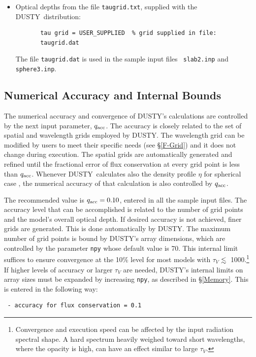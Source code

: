 \documentclass[11pt]{article}
\def\D  {{\sf DUSTY}}
\def\laa    {\mathrel{\hbox{\raise.3ex\hbox{$<$}\llap
                                {\lower.8ex\hbox{$\sim$}}}}}
\def\la     {\hbox{$\laa$}}
\def\tV     {\hbox{$\tau_V$}}
\begin{document}
\begin{enumerate}
\begin{itemize}
\item Optical depths from the file {\tt taugrid.txt}, supplied with the
    \D\ distribution:
\begin{verbatim}
       tau grid = USER_SUPPLIED  % grid supplied in file:
       taugrid.dat
\end{verbatim}
The file {\tt taugrid.dat} is used in the sample input files {\tt
slab2.inp} and {\tt sphere3.inp}.
\end{itemize}
\end{enumerate}

\subsection{Numerical Accuracy and Internal Bounds}
\label{numerics}

The numerical accuracy and convergence of \D's calculations are controlled by
the next input parameter, $q_{\rm acc}$. The accuracy is closely related to the
set of spatial and wavelength grids employed by \D. The wavelength grid can be
modified by users to meet their specific needs (see \S\ref{F-Grid}) and it does
not change during execution. The spatial grids are automatically generated and
refined until the fractional error of flux conservation at every grid point is
less than $q_{\rm acc}$. Whenever \D\ calculates also the density profile
$\eta$ for spherical case , the numerical accuracy of that calculation is also
controlled by $q_{\rm acc}$.

The recommended value is $q_{\rm acc} = 0.10$, entered in all the sample input
files. The accuracy level that can be accomplished is related to the number of
grid points and the model's overall optical depth. If desired accuracy is not
achieved, finer grids are generated.  This is done automatically by \D. The
maximum number of grid points is bound by \D's array dimensions, which are
controlled by the parameter {\tt npy} whose default value is 70. This internal
limit suffices to ensure convergence at the 10\% level for most models with
$\tau_V$ \la\ 1000.\footnote{Convergence and execution speed can be affected by
the input radiation spectral shape.  A hard spectrum heavily weighed toward
short wavelengths, where the opacity is high, can have an effect similar to
large \tV.} If higher levels of accuracy or larger $\tau_V$ are needed, \D's
internal limits on array sizes must be expanded by increasing {\tt npy}, as
described in \S\ref{Memory}. This is entered in the following way:
%
\begin{verbatim}
 - accuracy for flux conservation = 0.1
\end{verbatim}
\end{document}

